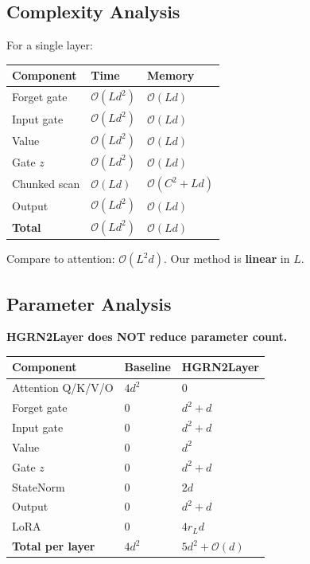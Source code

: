 \subsection{Complexity Analysis}

For a single layer:

\begin{table}[H]
\centering
\small
\begin{tabular}{lll}
\toprule
\textbf{Component} & \textbf{Time} & \textbf{Memory} \\
\midrule
Forget gate & $\mathcal{O}(L d^2)$ & $\mathcal{O}(L d)$ \\
Input gate & $\mathcal{O}(L d^2)$ & $\mathcal{O}(L d)$ \\
Value & $\mathcal{O}(L d^2)$ & $\mathcal{O}(L d)$ \\
Gate $z$ & $\mathcal{O}(L d^2)$ & $\mathcal{O}(L d)$ \\
Chunked scan & $\mathcal{O}(L d)$ & $\mathcal{O}(C^2 + L d)$ \\
Output & $\mathcal{O}(L d^2)$ & $\mathcal{O}(L d)$ \\
\textbf{Total} & $\mathcal{O}(L d^2)$ & $\mathcal{O}(L d)$ \\
\bottomrule
\end{tabular}
\end{table}

Compare to attention: $\mathcal{O}(L^2 d)$. Our method is \textbf{linear} in $L$.

\subsection{Parameter Analysis}

\textbf{HGRN2Layer does NOT reduce parameter count.}

\begin{table}[H]
\centering
\small
\begin{tabular}{lll}
\toprule
\textbf{Component} & \textbf{Baseline} & \textbf{HGRN2Layer} \\
\midrule
Attention Q/K/V/O & $4 d^2$ & 0 \\
Forget gate & 0 & $d^2 + d$ \\
Input gate & 0 & $d^2 + d$ \\
Value & 0 & $d^2$ \\
Gate $z$ & 0 & $d^2 + d$ \\
StateNorm & 0 & $2d$ \\
Output & 0 & $d^2 + d$ \\
LoRA & 0 & $4 r_L d$ \\
\textbf{Total per layer} & $4 d^2$ & $5 d^2 + \mathcal{O}(d)$ \\
\bottomrule
\end{tabular}
\end{table}

